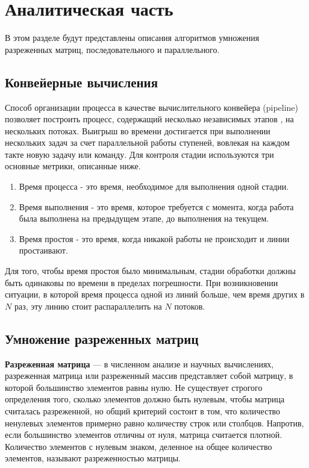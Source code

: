 \chapter{Аналитическая часть}
В этом разделе будут представлены описания алгоритмов умножения разреженных матриц, последовательного и параллельного.

\section{Конвейерные вычисления}

Способ организации процесса в качестве вычислительного конвейера (pipeline) позволяет построить процесс, содержащий несколько независимых этапов \cite{pipeline}, на нескольких потоках. Выигрыш во времени достигается при выполнении нескольких задач за счет параллельной работы ступеней, вовлекая на каждом такте новую задачу или команду. 
Для контроля стадии используются три основные метрики, описанные ниже.
\begin{enumerate}
	\setlength{\itemsep}{1.2pt}
	\item Время процесса - это время, необходимое для выполнения одной стадии.
	\item Время выполнения - это время, которое требуется с момента, когда работа была выполнена на предыдущем этапе, до выполнения на текущем. 
	\item Время простоя - это время, когда никакой работы не происходит и линии простаивают. 
\end{enumerate}
Для того, чтобы время простоя было минимальным, стадии обработки должны быть одинаковы по времени в пределах погрешности. При возникновении ситуации, в которой время процесса одной из линий больше, чем время других в $N$ раз, эту линию стоит распараллелить на $N$ потоков. 

\section{Умножение разреженных матриц}

\textbf{Разреженная матрица} \cite{piss} — в численном анализе и научных вычислениях, разреженная матрица или разреженный массив представляет собой матрицу, в которой большинство элементов равны нулю. Не существует строгого определения того, сколько элементов должно быть нулевым, чтобы матрица считалась разреженной, но общий критерий состоит в том, что количество ненулевых элементов примерно равно количеству строк или столбцов. Напротив, если большинство элементов отличны от нуля, матрица считается плотной. Количество элементов с нулевым знаком, деленное на общее количество элементов, называют разреженностью матрицы.


